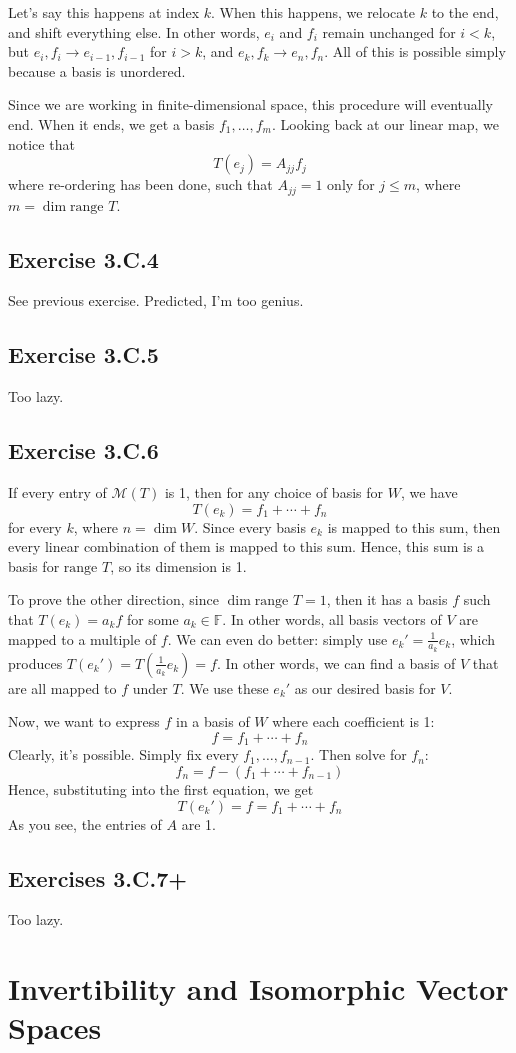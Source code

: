 \documentclass{book}
\begin{document}
Let's say this happens at index $k$. When this happens, we relocate $k$ to the end, and shift everything else. In other words, $e_i$ and $f_i$ remain unchanged for $i < k$, but $e_i, f_i \rightarrow e_{i - 1}, f_{i - 1}$ for $i > k$, and $e_k, f_k \rightarrow e_n, f_n$. All of this is possible simply because a basis is unordered.

Since we are working in finite-dimensional space, this procedure will eventually end. When it ends, we get a basis $f_1, \ldots, f_m$. Looking back at our linear map, we notice that
$$T(e_j) = A_{jj} f_j$$
where re-ordering has been done, such that $A_{jj} = 1$ only for $j \leq m$, where $m = \dim \text{range } T$.

\subsection*{Exercise 3.C.4}
See previous exercise. Predicted, I'm too genius.

\subsection*{Exercise 3.C.5}
Too lazy.

\subsection*{Exercise 3.C.6}
If every entry of $\mathcal{M}(T)$ is 1, then for any choice of basis for $W$, we have
$$T(e_k) = f_1 + \cdots + f_n$$
for every $k$, where $n = \dim W$. Since every basis $e_k$ is mapped to this sum, then every linear combination of them is mapped to this sum. Hence, this sum is a basis for $\text{range } T$, so its dimension is 1.

To prove the other direction, since $\dim \text{range } T = 1$, then it has a basis $f$ such that $T(e_k) = a_kf$ for some $a_k \in \mathbb{F}$. In other words, all basis vectors of $V$ are mapped to a multiple of $f$. We can even do better: simply use $e_k' = \frac{1}{a_k} e_k$, which produces $T(e_k') = T(\frac{1}{a_k} e_k) = f$. In other words, we can find a basis of $V$ that are all mapped to $f$ under $T$. We use these $e_k'$ as our desired basis for $V$.

Now, we want to express $f$ in a basis of $W$ where each coefficient is 1:
$$f = f_1 + \cdots + f_n$$
Clearly, it's possible. Simply fix every $f_1, \ldots, f_{n - 1}$. Then solve for $f_n$:
$$f_n = f - (f_1 + \cdots + f_{n - 1})$$
Hence, substituting into the first equation, we get
$$T\left( e_k' \right) = f = f_1 + \cdots + f_n$$
As you see, the entries of $A$ are 1.

\subsection*{Exercises 3.C.7+}
Too lazy.

\section{Invertibility and Isomorphic Vector Spaces}
\end{document}
